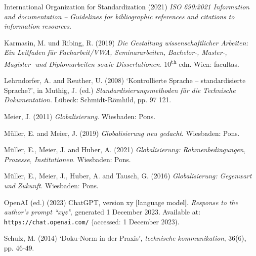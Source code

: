 \vspace{1mm}
International Organization for Standardization (2021) \textit{ISO 690:2021 Information and documentation – Guidelines for bibliographic references and citations to information resources}.

\vspace{1mm}
Karmasin, M. und Ribing, R. (2019) \textit{Die Gestaltung wissenschaftlicher Arbeiten: Ein Leitfaden für Facharbeit/VWA, Seminararbeiten, Bachelor-, Master-, Magister- und Diplomarbeiten sowie Dissertationen.}
10\textsuperscript{th} edn. Wien: facultas.

\vspace{1mm}
Lehrndorfer, A. and Reuther, U. (2008) ‘Kontrollierte Sprache – standardisierte Sprache?{’}, in Muthig, J. (ed.) \textit{Standardisierungsmethoden für die Technische Dokumentation.} Lübeck: Schmidt-Römhild, pp. 97 121.

\vspace{1mm}
Meier, J. (2011) \textit{Globalisierung}. Wiesbaden: Pons.

\vspace{1mm}
Müller, E. and Meier, J. (2019) \textit{Globalisierung neu gedacht}. Wiesbaden: Pons.

\vspace{1mm}
Müller, E., Meier, J. and Huber, A. (2021) \textit{Globalisierung: Rahmenbedingungen, Prozesse, Institutionen}. Wiesbaden: Pons.

\vspace{1mm}
Müller, E., Meier, J., Huber, A. and Tausch, G. (2016) \textit{Globalisierung: Gegenwart und Zukunft}. Wiesbaden: Pons.

\vspace{1mm}
OpenAI (ed.) (2023) ChatGPT, version xy [language model]. \textit{Response to the author’s prompt “xyz”}, generated 1 December 2023. Available at: \newline 
\texttt{https://chat.openai.com/} (accessed: 1 December 2023).

\vspace{1mm}
Schulz, M. (2014) ‘Doku-Norm in der Praxis’, \textit{technische kommunikation}, 36(6), pp. 46-49.

\vspace{1mm}


